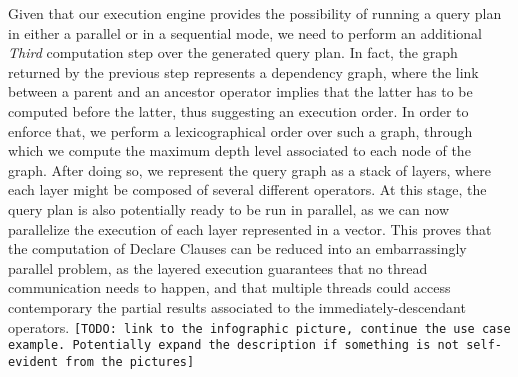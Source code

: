 Given that our execution engine provides the possibility of running a query plan in either a parallel or in a sequential mode, we need to perform an additional \textit{Third} computation step over the generated query plan. In fact, the graph returned by the previous step represents a dependency graph, where the link between a parent and an ancestor operator implies that the latter has to be computed before the latter, thus suggesting an execution order. In order to enforce that, we perform a lexicographical order over such a graph, through which we compute the maximum depth level associated to each node of the graph. After doing so, we represent the query graph as a stack of layers, where each layer might be composed of several different operators. At this stage, the query plan is also potentially ready to be run in parallel, as we can now parallelize the execution of each layer represented in a vector. This proves that the computation of Declare Clauses can be reduced into an embarrassingly parallel problem, as the layered execution guarantees that no thread communication needs to happen, and that multiple threads could access contemporary the partial results associated to the immediately-descendant operators. \texttt{\color{red}[TODO: link to the infographic picture, continue the use case example. Potentially expand the description if something is not self-evident from the pictures]}
